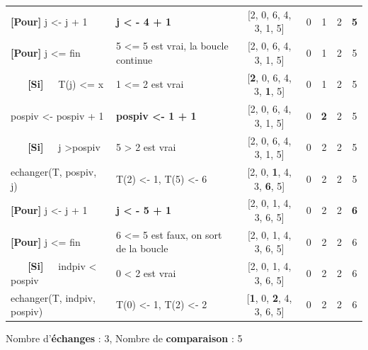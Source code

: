 \documentclass[10pt]{article} %
\newcommand{\asgold}[1]{\textcolor{mygold}{{\bf#1}}}
\newcommand{\asgr}[1]{\textcolor{mygreen}{{\bf#1}}}
\newcommand{\aspurp}[1]{\textcolor{mypurp}{{\bf#1}}}
\begin{document}
\begin{table}[h!]
\begin{tabular}{ll|ccccc}
    \asgr{[Pour]} j \textless{}- j + 1   &  \asgold{j \textless{} - 4 + 1}                             & {[}2, 0, 6, 4, 3, 1, 5{]} & 0      & 1      & 2 & \asgold{5} \\
    \asgr{[Pour]} j \textless{}= fin      & 5 \textless{}= 5 est vrai, la boucle continue                 & {[}2, 0, 6, 4, 3, 1, 5{]} & 0      & 1      & 2 & 5 \\
    \asgr{\ \ \ [Si]\ \ } T(j) \textless{}= x       & \cellcolor{mypurp} 1 \textless{}= 2 est vrai                                     & {[}\aspurp{2}, 0, 6, 4, 3, \aspurp{1}, 5{]} & 0      & 1      & 2 & 5 \\
    pospiv \textless{}- pospiv + 1 &      \asgold{pospiv \textless{}- 1 + 1}                                                         & {[}2, 0, 6, 4, 3, 1, 5{]} & 0      & \asgold{2}      & 2 & 5 \\
    \asgr{\ \ \ [Si]\ \ } j \textgreater pospiv     & 5 \textgreater{} 2 est vrai                                     & {[}2, 0, 6, 4, 3, 1, 5{]} & 0      & 2      & 2 & 5 \\
    echanger(T, pospiv, j)         & \cellcolor{mygold}T(2) \textless{}- 1, T(5) \textless{}- 6                                         & {[}2, 0, \asgold{1}, 4, 3, \asgold{6}, 5{]} & 0      & 2      & 2 & 5 \\
    \asgr{[Pour]} j \textless{}- j + 1   &  \asgold{j \textless{} - 5 + 1}                             & {[}2, 0, 1, 4, 3, 6, 5{]} & 0      & 2      & 2 & \asgold{6} \\
    \asgr{[Pour]} j \textless{}= fin      & 6 \textless{}= 5 est faux, on sort de la boucle               & {[}2, 0, 1, 4, 3, 6, 5{]} & 0      & 2      & 2 & 6 \\
    \asgr{\ \ \ [Si]\ \ } indpiv \textless{} pospiv   & 0 \textless{} 2 est vrai                                        & {[}2, 0, 1, 4, 3, 6, 5{]} & 0      & 2      & 2 & 6 \\
    echanger(T, indpiv, pospiv)    &  \cellcolor{mygold}T(0) \textless{}- 1, T(2) \textless{}- 2                                        & {[}\asgold{1}, 0, \asgold{2}, 4, 3, 6, 5{]} & 0      & 2      & 2 & 6 \\
    \hline
    \end{tabular}
    \end{table}

\vspace{-0.4cm}
\noindent Nombre d'\asgold{échanges} : 3, Nombre de \aspurp{comparaison} : 5
\end{document}
